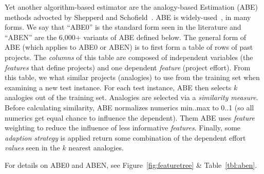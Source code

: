\documentclass[10pt,conference]{IEEEtran}
\newcommand{\fig}[1]{Figure~\ref{fig:#1}}
\begin{document}
Yet another algorithm-based estimator are the 
analogy-based Estimation (ABE) methods advocted by Shepperd and Schofield~\cite{shepperd1997estimating}. ABE is widely-used~\cite{7194627,Kocaguneli2015,7426628,6092574,MenziesNeg:2017}, in many forms.
We  say that  ``ABE0'' is the standard  form  seen in the literature
and ``ABEN'' are the 6,000+ variants of ABE  defined below. 
The general form of ABE (which applies to  ABE0 or ABEN) is
to first form a table of rows of past projects. The {\em columns} of this table are composed of independent variables (the {\em features} that define projects) and one dependent {\em feature} (project  effort).
From this table, we   what  similar projects (analogies) to use from the training set when examining a new test instance.
For each test instance, ABE then selects   $k$ analogies out of the training set.
Analogies are selected via   a {\em similarity measure}. 
Before calculating similarity,  ABE normalizes   numerics  min..max to 0..1 (so all numerics   get equal chance to influence the dependent). 
Them ABE uses {\em feature} weighting to reduce the influence of less informative {\em features}.
Finally, some  {\em adaption strategy} is applied  return some combination of  the dependent effort {\em values} seen in  the $k$ nearest analogies.

For  details on ABE0 and ABEN, see \fig{featuretree} \& Table~\ref{tbl:aben}. 
\end{document}
